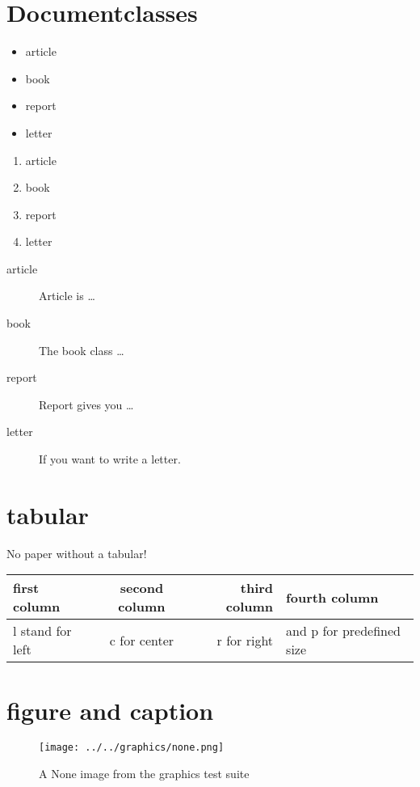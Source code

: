 \documentclass[12pt, a4paper, twoside, titlepage]{article}
\begin{document}
\section{Documentclasses} \label{documentclasses}

\begin{itemize}
\item article
\item book
\item report
\item letter
\end{itemize}


\begin{enumerate}
\item article
\item book
\item report
\item letter
\end{enumerate}

\begin{description}
\item[article\label{article}]{Article is \ldots}
\item[book\label{book}]{The book class \ldots}
\item[report\label{report}]{Report gives you \ldots}
\item[letter\label{letter}]{If you want to write a letter.}
\end{description}

\section{tabular}
No paper without a tabular!

\begin{tabular}{|l|c|r|p{2cm}|}
\hline
first column & second column & third column & fourth column \\
\hline
l stand for left & c for center & r for right & and p for predefined size \\
\hline
\end{tabular}

\section{figure and caption}
\begin{figure}[h]
	\texttt{[image: ../../graphics/none.png]}
	\caption{A None image from the graphics test suite}
\end{figure}
\end{document}
